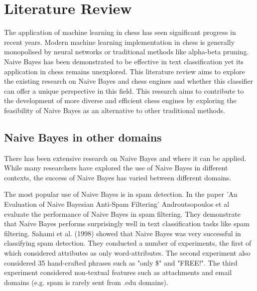\chapter{Literature Review}

The application of machine learning in chess has seen significant progress in recent years. Modern machine learning implementation in chess is generally monopolised by neural networks or traditional methods like alpha-beta pruning. Naive Bayes has been demonstrated to be effective in text classification yet its application in chess remains unexplored. This literature review aims to explore the existing research on Naive Bayes and chess engines and whether this classifier can offer a unique perspective in this field. This research aims to contribute to the development of more diverse and efficient chess engines by exploring the feasibility of Naive Bayes as an alternative to other traditional methods.


\section{Naive Bayes in other domains}
There has been extensive research on Naive Bayes and where it can be applied. While many researchers have explored the use of Naive Bayes in different contexts, the success of Naive Bayes has varied between different domains.

The most popular use of Naive Bayes is in spam detection. In the paper 'An Evaluation of Naive Bayesian Anti-Spam Filtering'  Androutsopoulos et al \cite{androutsopoulosEvaluationNaiveBayesian2000} evaluate the performance of Naive Bayes in spam filtering. They demonstrate that Naive Bayes performs surprisingly well in text classification tasks like spam filtering. Sahami et al. (1998) \cite{sahamiBayesianApproachFiltering} showed that Naive Bayes was very successful in classifying spam detection. They conducted a number of experiments, the first of which considered attributes as only word-attributes. The second experiment also considered 35 hand-crafted phrases such as "only \$" and "FREE!". The third experiment considered non-textual features such as attachments and email domains (e.g. spam is rarely sent from .edu domains). 


